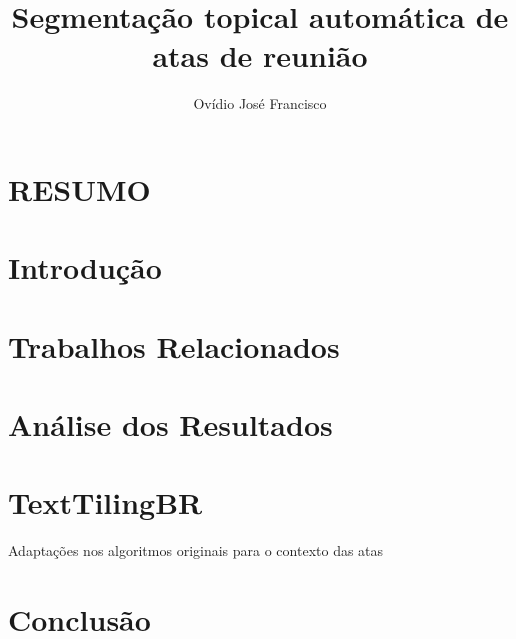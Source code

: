 \documentclass{sig-alternate-05-2015}
\begin{document}
\title{Segmentação topical automática de atas de reunião}



\author{
\alignauthor Ovídio José Francisco\\
}

\maketitle

%

\section*{RESUMO}



\keywords{}

\begingroup
\let\clearpage\relax

\section{Introdução}
	\label{sec:introducao}
	

\section{Trabalhos Relacionados}
	\label{sec:trabalhos}
	

\section{Análise dos Resultados}
	\label{sec:resultados}
	
	
\section{TextTilingBR}

Adaptações nos algoritmos originais para o contexto das atas


\section{Conclusão}
	\label{sec:conclusao}
	
\endgroup




	
\pagestyle{empty}
 	\label{sec:anexo}
 	
\end{document}
